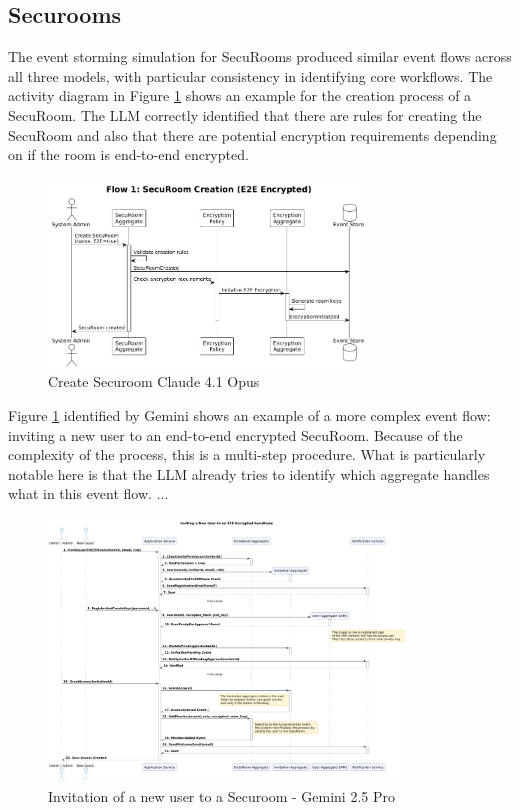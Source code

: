 \subsection{Securooms}
The event storming simulation for SecuRooms produced similar event flows across all three models, with particular consistency in identifying core workflows. The activity diagram in Figure \ref{fig:event-create-securoom-claude} shows an example for the creation process of a SecuRoom. The LLM correctly identified that there are rules for creating the SecuRoom and also that there are potential encryption requirements depending on if the room is end-to-end encrypted.

\begin{figure}[H]
    \centering
    \includegraphics[height=5cm]{figures/create-securoom-claude.png} 
    \caption{Create Securoom Claude 4.1 Opus}
    \label{fig:event-create-securoom-claude} 
  \end{figure}

Figure \ref{fig:event-create-securoom-claude} identified by Gemini shows an example of a more complex event flow: inviting a new user to an end-to-end encrypted SecuRoom. Because of the complexity of the process, this is a multi-step procedure. What is particularly notable here is that the LLM already tries to identify which aggregate handles what in this event flow. ...

\begin{figure}[H]
    \centering
    \includegraphics[height=7cm]{figures/invitaion-new-user-gemini.png} 
    \caption{Invitation of a new user to a Securoom - Gemini 2.5 Pro}
    \label{fig:event-invite-new-user-gemini} 
  \end{figure}

